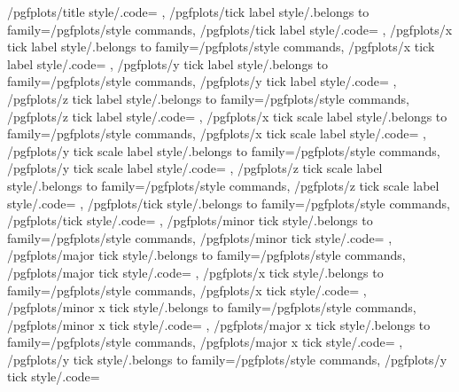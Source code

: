{	/pgfplots/title style/.code={%
	},
	/pgfplots/tick label style/.belongs to family=/pgfplots/style commands,
	/pgfplots/tick label style/.code={%
	},
	/pgfplots/x tick label style/.belongs to family=/pgfplots/style commands,
	/pgfplots/x tick label style/.code={%
	},
	/pgfplots/y tick label style/.belongs to family=/pgfplots/style commands,
	/pgfplots/y tick label style/.code={%
	},
	/pgfplots/z tick label style/.belongs to family=/pgfplots/style commands,
	/pgfplots/z tick label style/.code={%
	},
	/pgfplots/x tick scale label style/.belongs to family=/pgfplots/style commands,
	/pgfplots/x tick scale label style/.code={%
	},
	/pgfplots/y tick scale label style/.belongs to family=/pgfplots/style commands,
	/pgfplots/y tick scale label style/.code={%
	},
	/pgfplots/z tick scale label style/.belongs to family=/pgfplots/style commands,
	/pgfplots/z tick scale label style/.code={%
	},
	/pgfplots/tick style/.belongs to family=/pgfplots/style commands,
	/pgfplots/tick style/.code={%
	},
	/pgfplots/minor tick style/.belongs to family=/pgfplots/style commands,
	/pgfplots/minor tick style/.code={%
	},
	/pgfplots/major tick style/.belongs to family=/pgfplots/style commands,
	/pgfplots/major tick style/.code={%
	},
	/pgfplots/x tick style/.belongs to family=/pgfplots/style commands,
	/pgfplots/x tick style/.code={%
	},
	/pgfplots/minor x tick style/.belongs to family=/pgfplots/style commands,
	/pgfplots/minor x tick style/.code={%
	},
	/pgfplots/major x tick style/.belongs to family=/pgfplots/style commands,
	/pgfplots/major x tick style/.code={%
	},
	/pgfplots/y tick style/.belongs to family=/pgfplots/style commands,
	/pgfplots/y tick style/.code={%
}}
